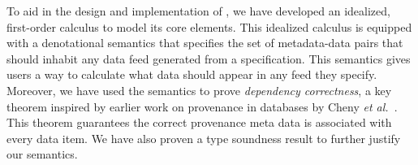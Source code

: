 

To aid in the design and implementation of \padsd{}, we have developed
an idealized, first-order calculus to model its core elements.  
This idealized calculus is equipped with a denotational
semantics that specifies the set of metadata-data pairs that should
inhabit any data feed generated from a specification.  This semantics
gives users a way to calculate what data should appear in any feed
they specify.  Moreover, we have used the
semantics to prove {\em dependency correctness}, a key theorem
inspired by earlier work on provenance in databases by 
Cheny {\em et al.}~\cite{cheney-dbpl07}.  This theorem
guarantees the correct provenance meta data is associated with
every data item.  We have also proven a type soundness result
to further justify our semantics.

